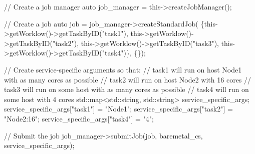 \begin{DoxyCode}
\textcolor{comment}{// Create a job manager}
\textcolor{keyword}{auto} job\_manager = this->createJobManager();

\textcolor{comment}{// Create a job}
\textcolor{keyword}{auto} job = job\_manager->createStandardJob(
                 \{this->getWorklow()->getTaskByID(\textcolor{stringliteral}{"task1"}),
                  this->getWorklow()->getTaskByID(\textcolor{stringliteral}{"task2"}),
                  this->getWorklow()->getTaskByID(\textcolor{stringliteral}{"task3"}),
                  this->getWorklow()->getTaskByID(\textcolor{stringliteral}{"task4"})\}, \{\});

\textcolor{comment}{// Create service-specific arguments so that:}
\textcolor{comment}{//   task1 will run on host Node1 with as many cores as possible}
\textcolor{comment}{//   task2 will run on host Node2 with 16 cores}
\textcolor{comment}{//   task3 will run on some host with as many cores as possible}
\textcolor{comment}{//   task4 will run on some host with 4 cores}
std::map<std::string, std::string> service\_specific\_args;
service\_specific\_args[\textcolor{stringliteral}{"task1"}] = \textcolor{stringliteral}{"Node1"};
service\_specific\_args[\textcolor{stringliteral}{"task2"}] = \textcolor{stringliteral}{"Node2:16"};
service\_specific\_args[\textcolor{stringliteral}{"task4"}] = \textcolor{stringliteral}{"4"};

\textcolor{comment}{// Submit the job}
job\_manager->submitJob(job, baremetal\_cs, service\_specific\_args);
\end{DoxyCode}
 